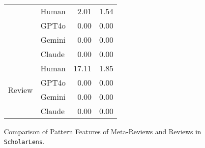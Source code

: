 \begin{figure}[h]
\begin{minipage}{1\linewidth}
{\begin{tabular}{l|l|r|r}
            & Human& 2.01& 1.54 \\
            & GPT4o& 0.00&0.00 \\
            & Gemini& 0.00&0.00 \\
            & Claude& 0.00&0.00 \\
        \midrule
        \multirow{4}{*}{Review} 
            & Human& 17.11& 1.85 \\
            & GPT4o& 0.00&0.00 \\
            & Gemini& 0.00&0.00 \\
            & Claude& 0.00&0.00 \\
        \bottomrule
    \end{tabular}}
    \end{minipage}
    \hfill
    \begin{minipage}{1\linewidth}
        \centering
    \end{minipage}
    \hfill

    \caption{Comparison of Pattern Features of Meta-Reviews and Reviews in \texttt{ScholarLens}.}
    \label{tab:pattern_comparison}
\end{figure}